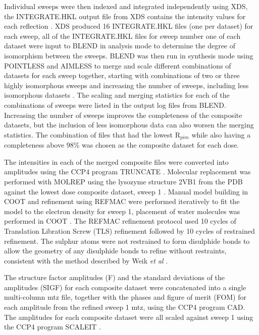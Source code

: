 Individual sweeps were then indexed and integrated independently using XDS, the INTEGRATE.HKL output file from XDS contains the intensity values for each reflection \cite{Kabsch2010}. XDS produced 16 INTEGRATE.HKL files (one per dataset) for each sweep, all of the INTEGRATE.HKL files for sweep number one of each dataset were input to BLEND in analysis mode to determine the degree of isomorphism between the sweeps. BLEND was then run in synthesis mode using POINTLESS and AIMLESS to merge and scale different combinations of datasets for each sweep together, starting with combinations of two or three highly isomorphous sweeps and increasing the number of sweeps, including less isomorphous datasets \cite{Evans2013,Foadi2013}. The scaling and merging statistics for each of the combinations of sweeps were listed in the output log files from BLEND. Increasing the number of sweeps improves the completeness of the composite datasets, but the inclusion of less isomorphous data can also worsen the merging statistics. The combination of files that had the lowest R$_{pim}$ while also having a completeness above 98\% was chosen as the composite dataset for each dose.  

The intensities in each of the merged composite files were converted into amplitudes using the CCP4 program TRUNCATE \cite{French1978}. Molecular replacement was performed with MOLREP using the lysozyme structure 2VB1 from the PDB against the lowest dose composite dataset, sweep 1 \cite{Wang2007,Vagin1997}. Manual model building in COOT and refinement using REFMAC were performed iteratively to fit the model to the electron density for sweep 1, placement of water molecules was performed in COOT \cite{Emsley2010,Murshudov1997}. The REFMAC refinement protocol used 10 cycles of Translation Libration Screw (TLS) refinement followed by 10 cycles of restrained refinement. The sulphur atoms were not restrained to form disulphide bonds to allow the geometry of any disulphide bonds to refine without restraints, consistent with the method described by Weik \textit{et al} \cite{Weik2002}.     

The structure factor amplitudes (F) and the standard deviations of the amplitudes (SIGF) for each composite dataset were concatenated into a single multi-column mtz file, together with the phases and figure of merit (FOM) for each amplitude from the refined sweep 1 mtz, using the CCP4 program CAD. The amplitudes for each composite dataset were all scaled against sweep 1 using the CCP4 program SCALEIT \cite{Howell1992}.   

